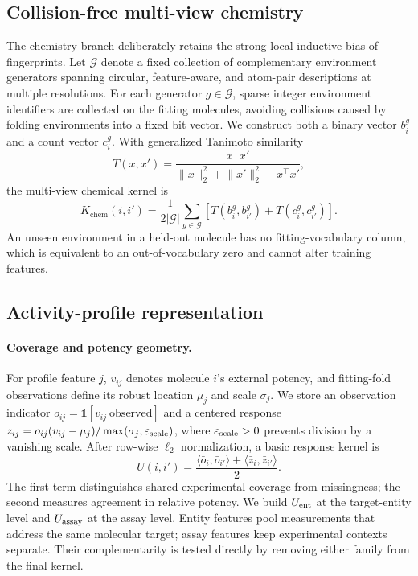 \documentclass[manuscript,nonacm]{acmart}
\begin{document}
\subsection{Collision-free multi-view chemistry}
The chemistry branch deliberately retains the strong local-inductive bias of
fingerprints. Let $\mathcal{G}$ denote a fixed collection of complementary
environment generators spanning circular, feature-aware, and atom-pair
descriptions at multiple resolutions. For each generator
$g\in\mathcal{G}$, sparse integer environment identifiers are collected on
the fitting molecules, avoiding collisions caused by folding environments into
a fixed bit vector.  We construct both a binary vector $b_i^g$ and a count
vector $c_i^g$.  With generalized Tanimoto similarity
\begin{equation}
T(x,x')=\frac{x^\top x'}{\lVert x\rVert_2^2+\lVert x'\rVert_2^2-x^\top x'},
\end{equation}
the multi-view chemical kernel is
\begin{equation}
K_{\mathrm{chem}}(i,i')=\frac{1}{2|\mathcal{G}|}\sum_{g\in\mathcal{G}}
\left[T(b_i^g,b_{i'}^g)+T(c_i^g,c_{i'}^g)\right].
\end{equation}
An unseen environment in a held-out molecule has no fitting-vocabulary column,
which is equivalent to an out-of-vocabulary zero and cannot alter training
features.

\subsection{Activity-profile representation}
\paragraph{Coverage and potency geometry.}
For profile feature $j$, $v_{ij}$ denotes molecule $i$'s external potency,
and fitting-fold observations define its robust location $\mu_j$ and scale
$\sigma_j$. We store an observation indicator
$o_{ij}=\mathbb{1}[v_{ij}\ \text{observed}]$ and a centered response
$z_{ij}=o_{ij}(v_{ij}-\mu_j)/\max(\sigma_j,\varepsilon_{\rm scale})$, where
$\varepsilon_{\rm scale}>0$ prevents division by a vanishing scale. After row-wise
$\ell_2$ normalization, a basic response kernel is
\begin{equation}
U(i,i')=\frac{\langle \bar{o}_i,\bar{o}_{i'}\rangle+
\langle \bar{z}_i,\bar{z}_{i'}\rangle}{2}.
\end{equation}
The first term distinguishes shared experimental coverage from missingness;
the second measures agreement in relative potency. We build $U_{\rm ent}$ at
the target-entity level and $U_{\rm assay}$ at the assay level. Entity features
pool measurements that address the same molecular target; assay features keep
experimental contexts separate. Their complementarity is tested directly by
removing either family from the final kernel.
\end{document}
